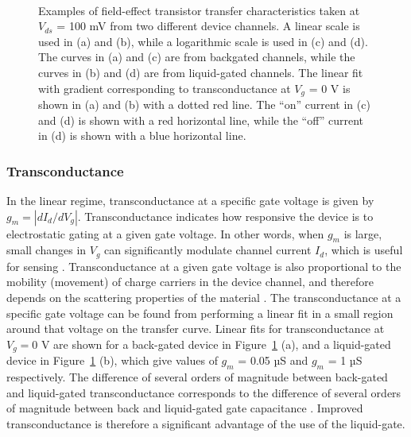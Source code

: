 \documentclass[
  a4paper,
]{scrbook}
\begin{document}
\begin{figure}
\begin{minipage}[t]{0.45\linewidth}
{{}

}

\end{minipage}%
%
\begin{minipage}[t]{0.01\linewidth}

{\centering 

~

}

\end{minipage}%

\caption{\label{fig-gating-transfer}Examples of field-effect transistor
transfer characteristics taken at \(V_{ds}\) = 100 mV from two different
device channels. A linear scale is used in (a) and (b), while a
logarithmic scale is used in (c) and (d). The curves in (a) and (c) are
from backgated channels, while the curves in (b) and (d) are from
liquid-gated channels. The linear fit with gradient corresponding to
transconductance at \(V_g\) = 0 V is shown in (a) and (b) with a dotted
red line. The ``on'' current in (c) and (d) is shown with a red
horizontal line, while the ``off'' current in (d) is shown with a blue
horizontal line.}

\end{figure}

\hypertarget{transconductance}{%
\subsubsection*{Transconductance}\label{transconductance}}

In the linear regime, transconductance at a specific gate voltage is
given by \(g_m = |dI_{d}/dV_g|\). Transconductance indicates how
responsive the device is to electrostatic gating at a given gate
voltage. In other words, when \(g_m\) is large, small changes in \(V_g\)
can significantly modulate channel current \(I_d\), which is useful for
sensing \autocite{Heller2009a,Ohno2015}. Transconductance at a given
gate voltage is also proportional to the mobility (movement) of charge
carriers in the device channel, and therefore depends on the scattering
properties of the material \autocite{Rouhi2010,Petti2016,Li2023}. The
transconductance at a specific gate voltage can be found from performing
a linear fit in a small region around that voltage on the transfer
curve. Linear fits for transconductance at \(V_g = 0\) V are shown for a
back-gated device in Figure~\ref{fig-gating-transfer} (a), and a
liquid-gated device in Figure~\ref{fig-gating-transfer} (b), which give
values of \(g_m\) = 0.05 µS and \(g_m\) = 1 µS respectively. The
difference of several orders of magnitude between back-gated and
liquid-gated transconductance corresponds to the difference of several
orders of magnitude between back and liquid-gated gate capacitance
\autocite{Tran2016,Shkodra2021}. Improved transconductance is therefore
a significant advantage of the use of the liquid-gate.
\end{document}
